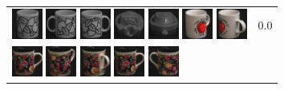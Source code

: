 \begin{figure}[tbp]
\begin{center}
\begin{tabular}{m{11cm} | m{3cm} |}
\includegraphics[width=1cm]{coil/beeld-52.eps}
\includegraphics[width=1cm]{coil/beeld-51.eps}
\includegraphics[width=1cm]{coil/beeld-48.eps}
\includegraphics[width=1cm]{coil/beeld-26.eps}
\includegraphics[width=1cm]{coil/beeld-28.eps}
\includegraphics[width=1cm]{coil/beeld-39.eps}
\includegraphics[width=1cm]{coil/beeld-40.eps}
& {\scriptsize 0.0}
\\
\includegraphics[width=1cm]{coil/beeld-60.eps}
\includegraphics[width=1cm]{coil/beeld-63.eps}
\includegraphics[width=1cm]{coil/beeld-64.eps}
\includegraphics[width=1cm]{coil/beeld-60.eps}
\includegraphics[width=1cm]{coil/beeld-61.eps}

\end{tabular}
\end{center}
\end{figure}
